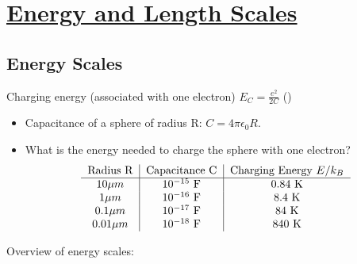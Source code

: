 
\section[Energy and Length Scales]{\hyperlink{toc}{Energy and Length Scales}}

\subsection{Energy Scales}

Charging energy (associated with one electron) $E_C = \frac{e^2}{2C}$ ()
\begin{itemize}
    \item Capacitance of a sphere of radius R: $C = 4 \pi \epsilon_0 R$.
    \item What is the energy needed to charge the sphere with one electron?
          \begin{align*}
              \begin{tabular}{c|c|c}
                  Radius R      & Capacitance C          & Charging Energy $E/k_B$ \\
                  \hline
                  $ 10 \mu m$   & $10^{-15}\ \mathrm{F}$ & $0.84\ \mathrm{K}$      \\
                  $ 1 \mu m$    & $10^{-16}\ \mathrm{F}$ & $8.4\ \mathrm{K}$       \\
                  $ 0.1 \mu m$  & $10^{-17}\ \mathrm{F}$ & $84\ \mathrm{K}$        \\
                  $ 0.01 \mu m$ & $10^{-18}\ \mathrm{F}$ & $840\ \mathrm{K}$       \\
              \end{tabular}
          \end{align*}
\end{itemize}

Overview of energy scales:

